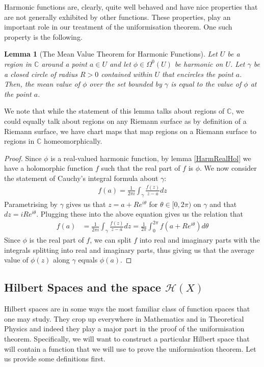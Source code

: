 \documentclass[11pt]{report}
\newtheorem{lemma}[thm]{Lemma}
\theoremstyle{definition}
\begin{document}
Harmonic functions are, clearly, quite well behaved and have nice properties that are not generally exhibited by other functions. These properties, play an important role in our treatment of the uniformisation theorem. One such property is the following.

\begin{lemma}[The Mean Value Theorem for Harmonic Functions]\label{MVT}
  Let $U$ be a region in $\mathbb{C}$ around a point $a \in U$ and let $\phi \in \Omega^0(U)$ be harmonic on $U$. Let $\gamma$ be a closed circle of radius $R > 0$ contained within $U$ that encircles the point $a$. Then, the mean value of $\phi$ over the set bounded by $\gamma$ is equal to the value of $\phi$ at the point $a$. 
\end{lemma}
We note that while the statement of this lemma talks about regions of $\mathbb{C}$, we could equally talk about regions on any Riemann surface as by definition of a Riemann surface, we have chart maps that map regions on a Riemann surface to regions in $\mathbb{C}$ homeomorphically. 
\begin{proof}
  Since $\phi$ is a real-valued harmonic function, by lemma \ref{HarmRealHol} we have a holomorphic function $f$ such that the real part of $f$ is $\phi$. We now consider the statement of Cauchy's integral formula about $\gamma$:
  \begin{align*}
    f(a) = \frac{1}{2\pi i}\int_{\gamma}\frac{f(z)}{z-a}dz
  \end{align*}
  Parametrising by $\gamma$ gives us that $z= a + Re^{i\theta}$ for $\theta \in [0, 2\pi)$ on $\gamma$ and that $dz = iRe^{i\theta}$. Plugging these into the above equation gives us the relation that
  \begin{align*}
    f(a) &= \frac{1}{2\pi i}\int_{\gamma}\frac{f(z)}{z-a}dz = \frac{1}{2\pi}\int_0^{2\pi}f(a+Re^{i\theta})d\theta
  \end{align*}
  Since $\phi$ is the real part of $f$, we can split $f$ into real and imaginary parts with the integrals splitting into real and imaginary parts, thus giving us that the average value of $\phi(z)$ along $\gamma$ equals $\phi(a)$.
\end{proof}

\subsection{Hilbert Spaces and the space $\mathcal{H}(X)$}

Hilbert spaces are in some ways the most familiar class of function spaces that one may study. They crop up everywhere in Mathematics and in Theoretical Physics and indeed they play a major part in the proof of the uniformisation theorem. Specifically, we will want to construct a particular Hilbert space that will contain a function that we will use to prove the uniformisation theorem. Let us provide some definitions first.
\end{document}
